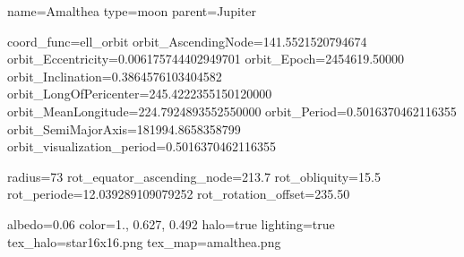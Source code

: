 
\begin{configfile}
[amalthea]
name=Amalthea
type=moon
parent=Jupiter

coord_func=ell_orbit
orbit_AscendingNode=141.5521520794674
orbit_Eccentricity=0.006175744402949701
orbit_Epoch=2454619.50000
orbit_Inclination=0.3864576103404582
orbit_LongOfPericenter=245.4222355150120000
orbit_MeanLongitude=224.7924893552550000
orbit_Period=0.5016370462116355
orbit_SemiMajorAxis=181994.8658358799
orbit_visualization_period=0.5016370462116355

radius=73
rot_equator_ascending_node=213.7
rot_obliquity=15.5
rot_periode=12.039289109079252
rot_rotation_offset=235.50

albedo=0.06
color=1., 0.627, 0.492
halo=true
lighting=true
tex_halo=star16x16.png
tex_map=amalthea.png
\end{configfile}

